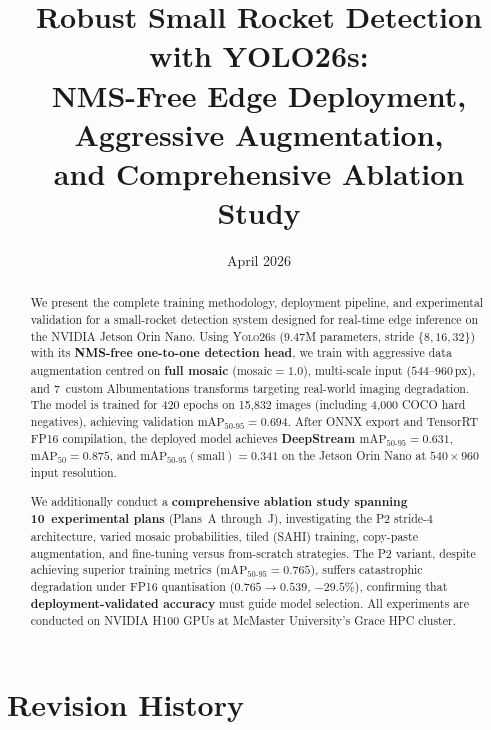 \documentclass[12pt, titlepage]{article}
\begin{document}
\title{Robust Small Rocket Detection with YOLO26s:\\
  NMS-Free Edge Deployment, Aggressive Augmentation,\\
  and Comprehensive Ablation Study}
\author{\authname}
\date{April 2026}

\maketitle

\begin{abstract}
  We present the complete training methodology, deployment pipeline, and
  experimental validation for a small-rocket detection system designed for
  real-time edge inference on the NVIDIA Jetson Orin Nano.  Using
  \textsc{Yolo26s} (9.47M parameters, stride $\{8, 16, 32\}$) with its
  \textbf{NMS-free one-to-one detection head}, we train with aggressive
  data augmentation centred on \textbf{full mosaic} ($\text{mosaic}=1.0$),
  multi-scale input ($544$--$960$\,px), and 7~custom Albumentations
  transforms targeting real-world imaging degradation.  The model is
  trained for 420 epochs on 15{,}832 images (including 4{,}000 COCO hard
  negatives), achieving validation
  $\text{mAP}_{50\text{-}95} = 0.694$.  After ONNX export and
  TensorRT FP16 compilation, the deployed model achieves
  \textbf{DeepStream $\text{mAP}_{50\text{-}95} = 0.631$},
  $\text{mAP}_{50} = 0.875$, and
  $\text{mAP}_{50\text{-}95}(\text{small}) = 0.341$ on the Jetson Orin
  Nano at $540{\times}960$ input resolution.

  We additionally conduct a \textbf{comprehensive ablation study spanning
    10~experimental plans} (Plans~A through~J), investigating the P2 stride-4
  architecture, varied mosaic probabilities, tiled (SAHI) training, copy-paste
  augmentation, and fine-tuning versus from-scratch strategies. The P2 variant,
  despite achieving superior training metrics ($\text{mAP}_{50\text{-}95} =
    0.765$), suffers catastrophic degradation under FP16 quantisation ($0.765 \to
    0.539$, $-29.5\%$), confirming that \textbf{deployment-validated accuracy} must
  guide model selection. All experiments are conducted on NVIDIA H100 GPUs at
  McMaster University's Grace HPC cluster.
\end{abstract}


\section*{Revision History}
\end{document}
